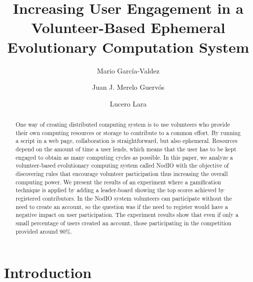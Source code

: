 \documentclass{llncs}
\begin{document}
\sloppy

\title{Increasing User Engagement in a Volunteer-Based Ephemeral Evolutionary Computation System}


\author{Mario Garc\'ia-Valdez \and Juan J. Merelo Guerv\'os \and  Lucero Lara }



\maketitle


\begin{abstract}

One way of creating distributed computing system is to use volunteers who
provide their own computing resources or storage to contribute to a common effort.
By running a script in a web page, collaboration is straightforward, but also ephemeral.
Resources depend on the amount of time a user lends, which means that 
the user has to be kept engaged to obtain as many computing cycles as
possible. In this paper, we analyze a volunteer-based evolutionary computing system called
NodIO with the objective of discovering rules that encourage volunteer
participation thus increasing the overall computing power. We present the results of
an experiment where a gamification technique is applied by adding a leader-board 
showing the top scores achieved by registered contributors. In the NodIO system volunteers can
participate without the need to create an account, so the question was
if the need to register would have a negative impact on user participation. 
The experiment results show that even if only a small percentage of users created an account,
those participating in the competition provided around 90\%.

\end{abstract}

\section{Introduction}
\end{document}
